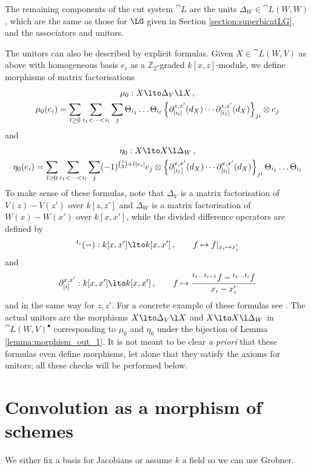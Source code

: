 The remaining components of the cut system $\cat{L}$ are the units $\Delta_W \in \cat{L}(W,W)$, which are the same as those for $\LG$ given in Section \ref{section:superbicatLG}, and the associators and unitors. 

The unitors can also be described by explicit formulas. Given $X \in \cat{L}(W,V)$ as above with homogeneous basis $e_i$ as a $\mathbb{Z}_2$-graded $k[x,z]$-module, we define morphisms of matrix factorisations
\begin{gather}
\mu_0: X \lto \Delta_V \l X \,, \\
\mu_0(e_i) = \sum_{l \ge 0} \sum_{i_1 < \cdots < i_l} \sum_j \Theta_{i_1} \ldots \Theta_{i_l} \left\{ \partial^{z,z'}_{[i_l]}(d_X) \cdots \partial^{z,z'}_{[i_1]}(d_X) \right\}_{ji} \otimes e_j\label{eq:explicit_mu0}
\end{gather}
and
\begin{gather}
\eta_0: X \lto X \l \Delta_W \,,\\
\eta_0(e_i) = \sum_{l \ge 0} \sum_{i_1 < \cdots < i_l} \sum_j (-1)^{\binom{l}{2} + l|e_i|} e_j \otimes \left\{ \partial^{x,x'}_{[i_1]}(d_X) \cdots \partial^{x,x'}_{[i_l]}(d_X) \right\}_{ji} \Theta_{i_1} \ldots \Theta_{i_l}
\end{gather}
To make sense of these formulas, note that $\Delta_V$ is a matrix factorisation of $V(z) - V(z')$ over $k[z,z']$ and $\Delta_W$ is a matrix factorisation of $W(x) - W(x')$ over $k[x,x']$, while the divided difference operators are defined by
\[
{}^{t_i}(-): k[x,x'] \lto k[x,x']\,, \qquad f \mapsto f|_{x_i \mapsto x'_i}
\]
and
\[
\partial^{x,x'}_{[i]}: k[x,x'] \lto k[x,x']\,, \qquad f \mapsto \frac{{}^{t_1 \ldots t_{i-1}} f - {}^{t_1 \ldots t_i} f}{x_i - x'_i}
\]
and in the same way for $z,z'$. For a concrete example of these formulas see \cite{lgdual_survey}. The actual unitors are the morphisms $X \lto \Delta_V \l X$ and $X \lto X \l \Delta_W$ in $\cat{L}(W,V)^\bullet$ corresponding to $\mu_0$ and $\eta_0$ under the bijection of Lemma \ref{lemma:morphism_out_1}. It is not meant to be clear \emph{a priori} that these formulas even define morphisms, let alone that they satisfy the axioms for unitors; all these checks will be performed below.

\section{Convolution as a morphism of schemes}

We either fix a basis for Jacobians or assume $k$ a field so we can use Grobner.

